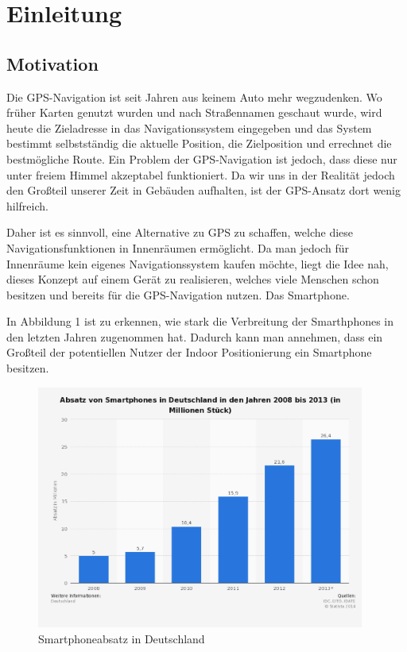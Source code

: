 \chapter{Einleitung}
\label{chap:introduction}

\section{Motivation}
\label{sec:introduction:motivation}

Die GPS-Navigation ist seit Jahren aus keinem Auto mehr wegzudenken. Wo früher Karten genutzt wurden und nach Straßennamen geschaut wurde, wird heute die Zieladresse in das Navigationssystem eingegeben und das System bestimmt selbstständig die aktuelle Position, die Zielposition und errechnet die bestmögliche Route.
Ein Problem der GPS-Navigation ist jedoch, dass diese nur unter freiem Himmel akzeptabel funktioniert.
Da wir uns in der Realität jedoch den Großteil unserer Zeit in Gebäuden aufhalten, ist der GPS-Ansatz dort wenig hilfreich.

Daher ist es sinnvoll, eine Alternative zu GPS zu schaffen, welche diese Navigationsfunktionen in Innenräumen ermöglicht.
Da man jedoch für Innenräume kein eigenes Navigationssystem kaufen möchte, liegt die Idee nah, dieses Konzept auf einem Gerät zu realisieren, welches viele Menschen schon besitzen und bereits für die GPS-Navigation nutzen. 
Das Smartphone.

In Abbildung 1 ist zu erkennen, wie stark die Verbreitung der Smarthphones in den letzten Jahren zugenommen hat. Dadurch kann man annehmen, dass ein Großteil der potentiellen Nutzer der Indoor Positionierung ein Smartphone besitzen.
\begin{figure}[htb]
	\centering
		\includegraphics[height=8cm]{pictures/statistik-smartphonenutzung.png}
		\caption{Smartphoneabsatz in Deutschland}
\end{figure}


